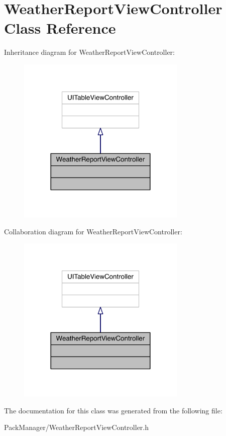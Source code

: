 \hypertarget{interface_weather_report_view_controller}{\section{Weather\-Report\-View\-Controller Class Reference}
\label{interface_weather_report_view_controller}
}


Inheritance diagram for Weather\-Report\-View\-Controller\-:\nopagebreak
\begin{figure}[H]
\begin{center}
\leavevmode
\includegraphics[width=228pt]{interface_weather_report_view_controller__inherit__graph}
\end{center}
\end{figure}


Collaboration diagram for Weather\-Report\-View\-Controller\-:\nopagebreak
\begin{figure}[H]
\begin{center}
\leavevmode
\includegraphics[width=228pt]{interface_weather_report_view_controller__coll__graph}
\end{center}
\end{figure}


The documentation for this class was generated from the following file\-:\begin{DoxyCompactItemize}
\item 
Pack\-Manager/Weather\-Report\-View\-Controller.\-h\end{DoxyCompactItemize}

